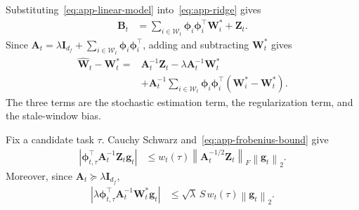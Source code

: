 Substituting~\eqref{eq:app-linear-model} into~\eqref{eq:app-ridge} gives
\begin{align*}
\mathbf{B}_t
&=\sum_{i\in\mathcal{W}_t}\boldsymbol{\phi}_{i}\boldsymbol{\phi}_{i}^{\top}\mathbf{W}_i^*
+\mathbf{Z}_t.
\end{align*}
Since \(\mathbf{A}_t=\lambda\mathbf{I}_{d_f}+\sum_{i\in\mathcal{W}_t}\boldsymbol{\phi}_{i}\boldsymbol{\phi}_{i}^{\top}\), adding and subtracting \(\mathbf{W}_t^*\) gives
\begin{align}
\widehat{\mathbf{W}}_t-\mathbf{W}_t^*
={}&\mathbf{A}_t^{-1}\mathbf{Z}_t-\lambda\mathbf{A}_t^{-1}\mathbf{W}_t^* \nonumber\\
&+\mathbf{A}_t^{-1}\sum_{i\in\mathcal{W}_t}\boldsymbol{\phi}_{i}\boldsymbol{\phi}_{i}^{\top}
\left(\mathbf{W}_i^*-\mathbf{W}_t^*\right).
\label{eq:app-exact-decomposition}
\end{align}
The three terms are the stochastic estimation term, the regularization term, and the stale-window bias.

Fix a candidate task \(\tau\). Cauchy Schwarz and~\eqref{eq:app-frobenius-bound} give
\begin{align*}
\left|\boldsymbol{\phi}_{t,\tau}^{\top}\mathbf{A}_t^{-1}\mathbf{Z}_t\mathbf{g}_t\right|
&\leq w_t(\tau)\left\lVert\mathbf{A}_t^{-1/2}\mathbf{Z}_t\right\rVert_F\left\lVert\mathbf{g}_t\right\rVert_2.
\end{align*}
Moreover, since \(\mathbf{A}_t\succeq\lambda\mathbf{I}_{d_f}\),
\begin{align*}
\left|\lambda\boldsymbol{\phi}_{t,\tau}^{\top}\mathbf{A}_t^{-1}\mathbf{W}_t^*\mathbf{g}_t\right|
&\leq\sqrt{\lambda}\,S\,w_t(\tau)\left\lVert\mathbf{g}_t\right\rVert_2.
\end{align*}


